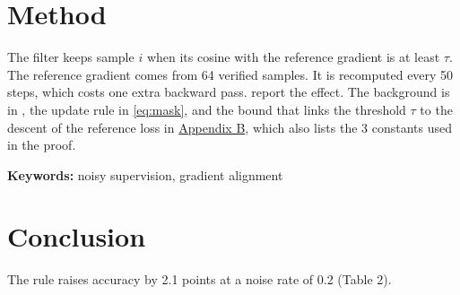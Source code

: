 \documentclass{article}
\begin{document}
\begin{abstract}
Noisy supervision makes a fine-tuned model memorize wrong labels. We filter samples by the angle between the
per-sample gradient $\partial \ell_i / \partial \theta$ and a reference gradient. At a noise rate of 0.2 the
accuracy rises by 2.1 points on three benchmarks (Table 2).
\end{abstract}

\section{Method}
The filter keeps sample $i$ when its cosine with the reference gradient is at least $\tau$. The reference
gradient comes from 64 verified samples. It is recomputed every 50 steps, which costs one extra backward pass.
 report the effect. The background is in \citep[see][Sec.~2]{DBLP:conf/nips/Vaswani17}, the update rule in
\autoref{eq:mask}, and the bound that links the threshold $\tau$ to the descent of the reference loss in
\hyperref[app:proofs]{Appendix B}, which also lists the 3 constants used in the proof.

\noindent\textbf{Keywords:} noisy supervision, gradient alignment

\section{Conclusion}
The rule raises accuracy by 2.1 points at a noise rate of 0.2 (Table 2).
\end{document}

